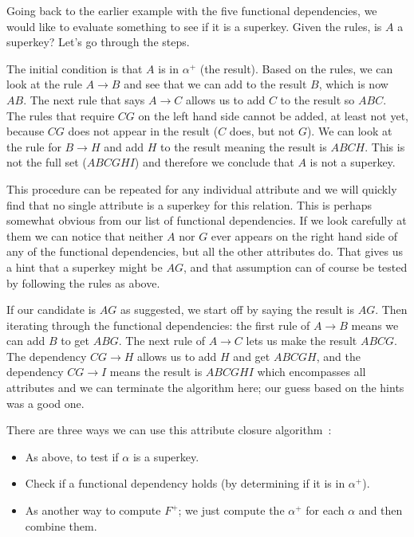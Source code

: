 Going back to the earlier example with the five functional dependencies, we would like to evaluate something to see if it is a superkey. Given the rules, is $A$ a superkey? Let's go through the steps. 

The initial condition is that $A$ is in $\alpha^{+}$ (the result). Based on the rules, we can look at the rule $A \rightarrow B$ and see that we can add to the result $B$, which is now $AB$. The next rule that says $A \rightarrow C$ allows us to add $C$ to the result so $ABC$. The rules that require $CG$ on the left hand side cannot be added, at least not yet, because $CG$ does not appear in the result ($C$ does, but not $G$). We can look at the rule for $B \rightarrow H$ and add $H$ to the result meaning the result is $ABCH$. This is not the full set ($ABCGHI$) and therefore we conclude that $A$ is not a superkey.

This procedure can be repeated for any individual attribute and we will quickly find that no single attribute is a superkey for this relation. This is perhaps somewhat obvious from our list of functional dependencies. If we look carefully at them we can notice that neither $A$ nor $G$ ever appears on the right hand side of any of the functional dependencies, but all the other attributes do. That gives us a hint that a superkey might be $AG$, and that assumption can of course be tested by following the rules as above.

If our candidate is $AG$ as suggested, we start off by saying the result is $AG$. Then  iterating through the functional dependencies: the first rule of $A \rightarrow B$ means we can add $B$ to get $ABG$. The next rule of $A \rightarrow C$ lets us make the result $ABCG$. The dependency $CG \rightarrow H$ allows us to add $H$ and get $ABCGH$, and the dependency $CG \rightarrow I$ means the result is $ABCGHI$ which encompasses all attributes and we can terminate the algorithm here; our guess based on the hints was a good one.

There are three ways we can use this attribute closure algorithm~\cite{dsc}:
\begin{itemize}
	\item As above, to test if $\alpha$ is a superkey.
	\item Check if a functional dependency holds (by determining if it is in $\alpha^{+}$).
	\item As another way to compute $F^{+}$; we just compute the $\alpha^{+}$ for each $\alpha$ and then combine them. 
\end{itemize}

